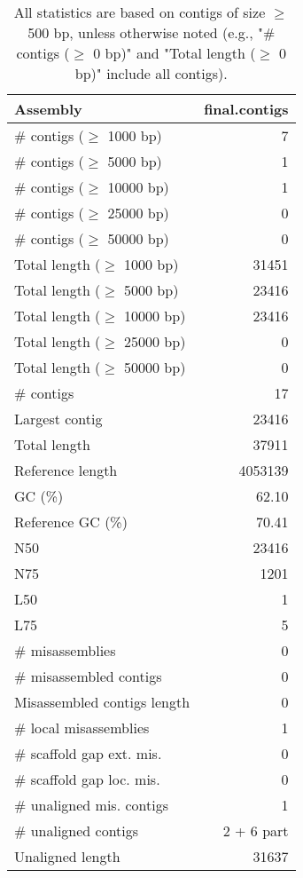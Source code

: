 \documentclass[12pt,a4paper]{article}
\begin{document}
\begin{table}[ht]
\begin{center}
\caption{All statistics are based on contigs of size $\geq$ 500 bp, unless otherwise noted (e.g., "\# contigs ($\geq$ 0 bp)" and "Total length ($\geq$ 0 bp)" include all contigs).}
\begin{tabular}{|l*{1}{|r}|}
\hline
Assembly & final.contigs \\ \hline
\# contigs ($\geq$ 1000 bp) & 7 \\ \hline
\# contigs ($\geq$ 5000 bp) & 1 \\ \hline
\# contigs ($\geq$ 10000 bp) & 1 \\ \hline
\# contigs ($\geq$ 25000 bp) & 0 \\ \hline
\# contigs ($\geq$ 50000 bp) & 0 \\ \hline
Total length ($\geq$ 1000 bp) & 31451 \\ \hline
Total length ($\geq$ 5000 bp) & 23416 \\ \hline
Total length ($\geq$ 10000 bp) & 23416 \\ \hline
Total length ($\geq$ 25000 bp) & 0 \\ \hline
Total length ($\geq$ 50000 bp) & 0 \\ \hline
\# contigs & 17 \\ \hline
Largest contig & 23416 \\ \hline
Total length & 37911 \\ \hline
Reference length & 4053139 \\ \hline
GC (\%) & 62.10 \\ \hline
Reference GC (\%) & 70.41 \\ \hline
N50 & 23416 \\ \hline
N75 & 1201 \\ \hline
L50 & 1 \\ \hline
L75 & 5 \\ \hline
\# misassemblies & 0 \\ \hline
\# misassembled contigs & 0 \\ \hline
Misassembled contigs length & 0 \\ \hline
\# local misassemblies & 1 \\ \hline
\# scaffold gap ext. mis. & 0 \\ \hline
\# scaffold gap loc. mis. & 0 \\ \hline
\# unaligned mis. contigs & 1 \\ \hline
\# unaligned contigs & 2 + 6 part \\ \hline
Unaligned length & 31637 \\ \hline

\end{tabular}
\end{center}
\end{table}
\end{document}
